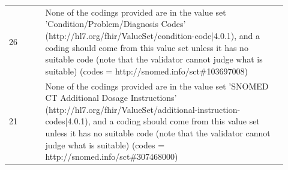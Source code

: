 {\begin{longtable}{p{0.12\linewidth}p{0.8\linewidth}}
26 & None of the codings provided are in the value set 'Condition/\allowbreak{}Problem/\allowbreak{}Diagnosis Codes' (http:\allowbreak{}/\allowbreak{}/\allowbreak{}hl7.\allowbreak{}org/\allowbreak{}fhir/\allowbreak{}ValueSet/\allowbreak{}condition-\allowbreak{}code|4.\allowbreak{}0.\allowbreak{}1), and a coding should come from this value set unless it has no suitable code (note that the validator cannot judge what is suitable) (codes = http:\allowbreak{}/\allowbreak{}/\allowbreak{}snomed.\allowbreak{}info/\allowbreak{}sct\#103697008) \\
21 & None of the codings provided are in the value set 'SNOMED CT Additional Dosage Instructions' (http:\allowbreak{}/\allowbreak{}/\allowbreak{}hl7.\allowbreak{}org/\allowbreak{}fhir/\allowbreak{}ValueSet/\allowbreak{}additional-\allowbreak{}instruction-\allowbreak{}codes|4.\allowbreak{}0.\allowbreak{}1), and a coding should come from this value set unless it has no suitable code (note that the validator cannot judge what is suitable) (codes = http:\allowbreak{}/\allowbreak{}/\allowbreak{}snomed.\allowbreak{}info/\allowbreak{}sct\#307468000) \\
\hline\end{longtable}}

